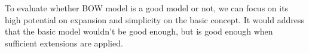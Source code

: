 To evaluate whether BOW model is a good model or not, we can focus on its high potential on expansion and simplicity on the basic concept. It would address that the basic model wouldn't be good enough, but is good enough when sufficient extensions are applied.








